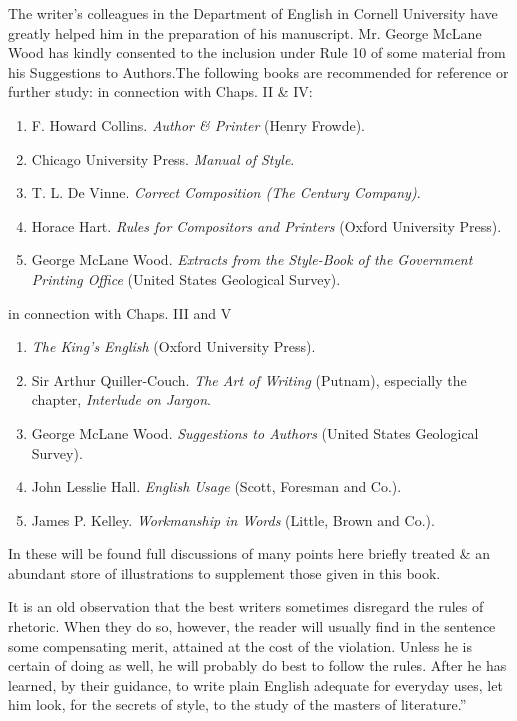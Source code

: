 \documentclass{article}
\begin{document}
The writer's colleagues in the Department of English in Cornell University have greatly helped him in the preparation of his manuscript. Mr. George McLane Wood has kindly consented to the inclusion under Rule 10 of some material from his Suggestions to Authors.The following books are recommended for reference or further study: in connection with Chaps. II \& IV:
\begin{enumerate}
	\item F. Howard Collins. {\it Author \& Printer} (Henry Frowde).
	\item Chicago University Press. {\it Manual of Style}.
	\item T. L. De Vinne. {\it Correct Composition (The Century Company)}.
	\item Horace Hart. {\it Rules for Compositors and Printers} (Oxford University Press).
	\item George McLane Wood. {\it Extracts from the Style-Book of the Government Printing Office} (United States Geological Survey).
\end{enumerate}
in connection with Chaps. III and V
\begin{enumerate}
	\item {\it The King's English} (Oxford University Press).
	\item Sir Arthur Quiller-Couch. {\it The Art of Writing} (Putnam), especially the chapter, {\it Interlude on Jargon}.
	\item George McLane Wood. {\it Suggestions to Authors} (United States Geological Survey).
	\item John Lesslie Hall. {\it English Usage} (Scott, Foresman and Co.).
	\item James P. Kelley. {\it Workmanship in Words} (Little, Brown and Co.).
\end{enumerate}
In these will be found full discussions of many points here briefly treated \& an abundant store of illustrations to supplement those given in this book.

It is an old observation that the best writers sometimes disregard the rules of rhetoric. When they do so, however, the reader will usually find in the sentence some compensating merit, attained at the cost of the violation. Unless he is certain of doing as well, he will probably do best to follow the rules. After he has learned, by their guidance, to write plain English adequate for everyday uses, let him look, for the secrets of style, to the study of the masters of literature.''

\end{document}
